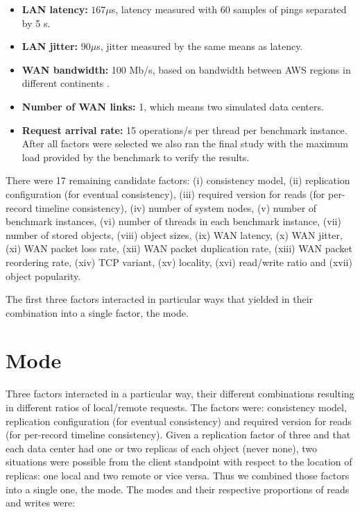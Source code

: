 \documentclass[man,floatsintext,12pt]{apa6}
\begin{document}
\begin{itemize}
\item \textbf{LAN latency:} $167\mu$s, latency measured with 60 samples of
pings separated by 5 s.

\item \textbf{LAN jitter:} $90\mu$s, jitter measured by the same means as
latency.

\item \textbf{WAN bandwidth:} 100 Mb/s, based on bandwidth between AWS regions
in different continents \parencite{Topchiy2013}.

\item \textbf{Number of WAN links:} 1, which means two simulated data centers.

\item \textbf{Request arrival rate:} 15 operations/s per thread per benchmark
instance. After all factors were selected we also ran the final study with the
maximum load provided by the benchmark to verify the results.

\end{itemize}

There were 17 remaining candidate factors: (i) consistency model, (ii)
replication configuration (for eventual consistency), (iii) required version
for reads (for per-record timeline consistency), (iv) number of system nodes,
(v) number of benchmark instances, (vi) number of threads in each benchmark
instance, (vii) number of stored objects, (viii) object sizes, (ix) WAN
latency, (x) WAN jitter, (xi) WAN packet loss rate, (xii) WAN packet
duplication rate, (xiii) WAN packet reordering rate, (xiv) TCP variant, (xv)
locality, (xvi) read/write ratio and (xvii) object popularity.

The first three factors interacted in particular ways that yielded in their
combination into a single factor, the mode.

\section{Mode}

Three factors interacted in a particular way, their different combinations
resulting in different ratios of local/remote requests. The factors were:
consistency model, replication configuration (for eventual consistency) and
required version for reads (for per-record timeline consistency). Given a
replication factor of three and that each data center had one or two replicas
of each object (never none), two situations were possible from the client
standpoint with respect to the location of replicas: one local and two remote
or vice versa. Thus we combined those factors into a single one, the mode. The
modes and their respective proportions of reads and writes were:
\end{document}

